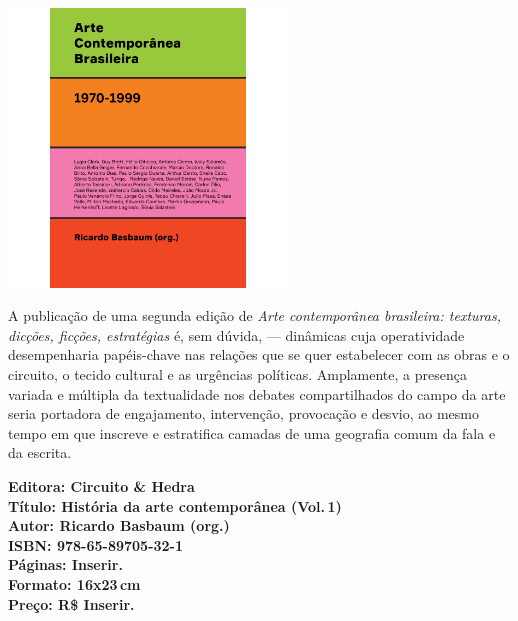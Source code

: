 \pagestyle{circuito}
\label{circuito}

\begin{center}
\hspace*{-3.6cm}
\hspace*{3.1cm}\includegraphics[width=74mm]{./CAPAS/CIRCUITO_BASBAUM.jpg}
\end{center}
\hspace*{-7cm}\hrulefill\hspace*{-7cm}
\medskip

\noindent{}A publicação de uma segunda edição de \textit{Arte contemporânea brasileira: texturas, dicções, ficções, estratégias} é, sem dúvida,  --- dinâmicas cuja operatividade desempenharia papéis-chave nas relações que se quer estabelecer com as obras e o circuito, o tecido cultural e as urgências políticas. Amplamente, a presença variada e múltipla da textualidade nos debates compartilhados do campo da arte seria portadora de engajamento, intervenção, provocação e desvio, ao mesmo tempo em que inscreve e estratifica camadas de uma geografia comum da fala e da escrita.

\vfill
\noindent\begin{minipage}[c]{1\linewidth}
{\small\textbf{
\hspace*{-.1cm}Editora: Circuito \& Hedra\\
Título: História da arte contemporânea (Vol.\,1)\\
Autor: Ricardo Basbaum (org.)\\ 
ISBN: 978-65-89705-32-1\\
Páginas: Inserir.\\
Formato: 16x23\,cm\\
Preço: R\$ Inserir.\\
}}
\end{minipage}
\pagebreak

